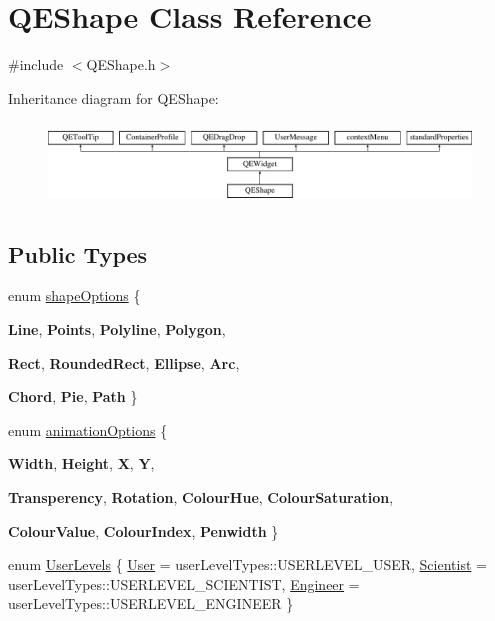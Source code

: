 \hypertarget{classQEShape}{
\section{QEShape Class Reference}
\label{classQEShape}
}


{\ttfamily \#include $<$QEShape.h$>$}

Inheritance diagram for QEShape:\begin{figure}[H]
\begin{center}
\leavevmode
\includegraphics[height=2.204725cm]{classQEShape}
\end{center}
\end{figure}
\subsection*{Public Types}
\begin{DoxyCompactItemize}
\item 
enum \hyperlink{classQEShape_a159b98721912181fdf5e3014173558ef}{shapeOptions} \{ \par
{\bfseries Line}, 
{\bfseries Points}, 
{\bfseries Polyline}, 
{\bfseries Polygon}, 
\par
{\bfseries Rect}, 
{\bfseries RoundedRect}, 
{\bfseries Ellipse}, 
{\bfseries Arc}, 
\par
{\bfseries Chord}, 
{\bfseries Pie}, 
{\bfseries Path}
 \}
\item 
enum \hyperlink{classQEShape_ae817ce1f72776774184d545dca59eec2}{animationOptions} \{ \par
{\bfseries Width}, 
{\bfseries Height}, 
{\bfseries X}, 
{\bfseries Y}, 
\par
{\bfseries Transperency}, 
{\bfseries Rotation}, 
{\bfseries ColourHue}, 
{\bfseries ColourSaturation}, 
\par
{\bfseries ColourValue}, 
{\bfseries ColourIndex}, 
{\bfseries Penwidth}
 \}
\item 
enum \hyperlink{classQEShape_a090921156d1b46560ff0fc1bacad18dd}{UserLevels} \{ \hyperlink{classQEShape_a090921156d1b46560ff0fc1bacad18ddaba04bc4d2f489dcdc4faeee7d08be78a}{User} =  userLevelTypes::USERLEVEL\_\-USER, 
\hyperlink{classQEShape_a090921156d1b46560ff0fc1bacad18dda0aa5c3279be3556992dd3555e12fdbf8}{Scientist} =  userLevelTypes::USERLEVEL\_\-SCIENTIST, 
\hyperlink{classQEShape_a090921156d1b46560ff0fc1bacad18dda1c87e82d6cd8070d2136c389d92486ce}{Engineer} =  userLevelTypes::USERLEVEL\_\-ENGINEER
 \}
\end{DoxyCompactItemize}
